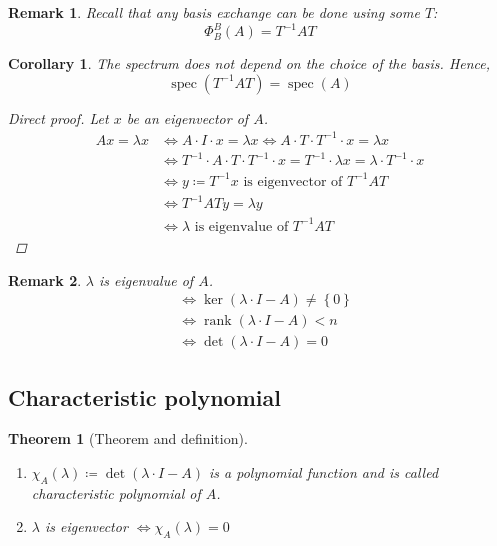 \documentclass{article}
\newtheorem{theorem}{Theorem}  \numberwithin{theorem}{section}
\newtheorem{remark}{Remark}  \numberwithin{remark}{section}
\newtheorem{corollary}{Corollary}  \numberwithin{corollary}{section}
\newcommand{\set}[1]{\left\{#1\right\}}
\DeclareMathOperator{\rank}{rank}
\begin{document}
\begin{remark}
  Recall that any basis exchange can be done using some $T$:
  \[ \Phi_B^B(A) = T^{-1} A T \]
\end{remark}

\begin{corollary}
  The spectrum does not depend on the choice of the basis. Hence,
  \[ \operatorname{spec}(T^{-1} AT) = \operatorname{spec}(A) \]

  \begin{proof}[Direct proof]
    Let $x$ be an eigenvector of $A$.
    \begin{align*}
      Ax = \lambda x &\iff A \cdot I \cdot x = \lambda x \iff A \cdot T \cdot T^{-1} \cdot x = \lambda x \\
                     &\iff T^{-1} \cdot A \cdot T \cdot T^{-1} \cdot x = T^{-1} \cdot \lambda x = \lambda \cdot T^{-1} \cdot x \\
                     &\iff y \coloneqq T^{-1} x \text{ is eigenvector of } T^{-1} AT \\
                     &\iff T^{-1} AT y = \lambda y \\
                     &\iff \lambda \text{ is eigenvalue of } T^{-1} AT
    \end{align*}
  \end{proof}
\end{corollary}

\begin{remark}
  $\lambda$ is eigenvalue of $A$.
  \begin{align*}
    &\iff \ker(\lambda \cdot I - A) \neq \set{0} \\
    &\iff \rank(\lambda \cdot I - A) < n \\
    &\iff \det(\lambda \cdot I - A) = 0
  \end{align*}
\end{remark}

\subsection{Characteristic polynomial}

\begin{theorem}[Theorem and definition] \hfill{} %
  \begin{enumerate}
    \item $\chi_A(\lambda) \coloneqq \det(\lambda \cdot I - A)$ is a polynomial function and is called \emph{characteristic polynomial of $A$}.
    \item $\lambda$ is eigenvector $\iff \chi_A(\lambda) = 0$
  \end{enumerate}
\end{theorem}
\end{document}
